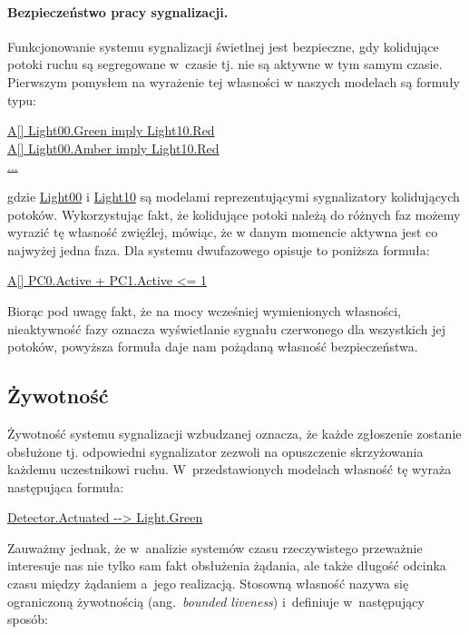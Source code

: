 \documentclass{pracamgr}
\newcommand{\ang}[1]{(ang.~\emph{#1})}
\newcommand{\ttt}[1]{\url{#1}}
\newcommand{\tttform}[1]{
  \begin{center}
    \ttt{#1}
  \end{center}
}
\theoremstyle{plain}
\begin{document}
\paragraph{Bezpieczeństwo pracy sygnalizacji.}
Funkcjonowanie systemu sygnalizacji świetlnej jest bezpieczne, gdy
kolidujące potoki ruchu są segregowane w~czasie tj. nie są aktywne w
tym samym czasie. Pierwszym pomysłem na wyrażenie tej własności w
naszych modelach są formuły typu:
\begin{center}
\ttt{A[] Light00.Green imply Light10.Red}\\
\ttt{A[] Light00.Amber imply Light10.Red}\\
\ttt{...}
\end{center}
gdzie \ttt{Light00} i \ttt{Light10} są modelami reprezentującymi
sygnalizatory kolidujących potoków. Wykorzystując fakt, że kolidujące
potoki należą do różnych faz możemy wyrazić tę własność zwięźlej,
mówiąc, że w danym momencie aktywna jest co najwyżej jedna faza. Dla
systemu dwufazowego opisuje to poniższa formuła:
\begin{center}
  \url{A[] PC0.Active + PC1.Active <= 1}
\end{center}
Biorąc pod uwagę fakt, że na mocy wcześniej wymienionych własności,
nieaktywność fazy oznacza wyświetlanie sygnału czerwonego dla
wszystkich jej potoków, powyższa formuła daje nam pożądaną własność
bezpieczeństwa.


\subsection{Żywotność}
\label{s:properties:liveness}

Żywotność systemu sygnalizacji wzbudzanej oznacza, że każde zgłoszenie
zostanie obsłużone tj. odpowiedni sygnalizator zezwoli na opuszczenie
skrzyżowania każdemu uczestnikowi ruchu. W~przedstawionych modelach
własność tę wyraża następująca formuła:
\tttform{Detector.Actuated --> Light.Green}
Zauważmy jednak, że w~analizie systemów czasu rzeczywistego przeważnie
interesuje nas nie tylko sam fakt obsłużenia żądania, ale także
długość odcinka czasu między żądaniem a~jego realizacją. Stosowną
własność nazywa się ograniczoną żywotnością \ang{bounded liveness}
i~definiuje w~następujący sposób:
\end{document}
